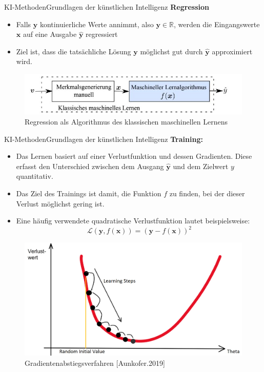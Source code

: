 \documentclass[169, handout	]{THIbeamer} %
\begin{document}
	\begin{frame}{KI-Methoden}{Grundlagen der künstlichen Intelligenz}
		\textbf{Regression}	
		\begin{itemize}
			\item Falls $\mathbf{y}$ kontinuierliche Werte annimmt, also $\mathbf{y} \in \mathbb{R}$, werden die Eingangswerte $\mathbf{x}$ auf eine Ausgabe $\hat{\mathbf{y}}$ regressiert 
			\item Ziel ist, dass die tatsächliche Lösung $\mathbf{y}$ möglichst gut durch $\hat{\mathbf{y}} $ approximiert wird.
		\end{itemize}			
		\begin{figure}
			\includegraphics[scale=0.7]{required/Machine Learning.jpg}
			\caption{Regression als Algorithmus des klassischen maschinellen Lernens}
        	\label{Machine Learning}
		\end{figure}
	\end{frame}
	\begin{frame}{KI-Methoden}{Grundlagen der künstlichen Intelligenz}
		\footnotesize
		\textbf{Training: } 		
		\scriptsize	
		\begin{itemize}
			\item Das Lernen basiert auf einer Verlustfunktion und dessen Gradienten. Diese erfasst den Unterschied zwischen dem Ausgang $\hat{\mathbf{y}}$ und dem Zielwert $y$ quantitativ.
			\item Das Ziel des Trainings ist damit, die Funktion $f$ zu finden, bei der dieser Verlust möglichst gering ist. 
			\item Eine häufig verwendete quadratische Verlustfunktion lautet beispielsweise:
			\begin{equation}
				\mathcal{L}(\mathbf{y}, f(\mathbf{x})) = (\mathbf{y} - f(\mathbf{x}))^{2}
			\end{equation}
		\end{itemize}	
		\begin{figure}
			\includegraphics[scale=0.17]{required/Loss_function.jpg}
			\caption{\scriptsize Gradientenabstiegsverfahren [Aunkofer.2019]}
        	\label{Machine Learning}
		\end{figure}			
	\end{frame}
\end{document}

